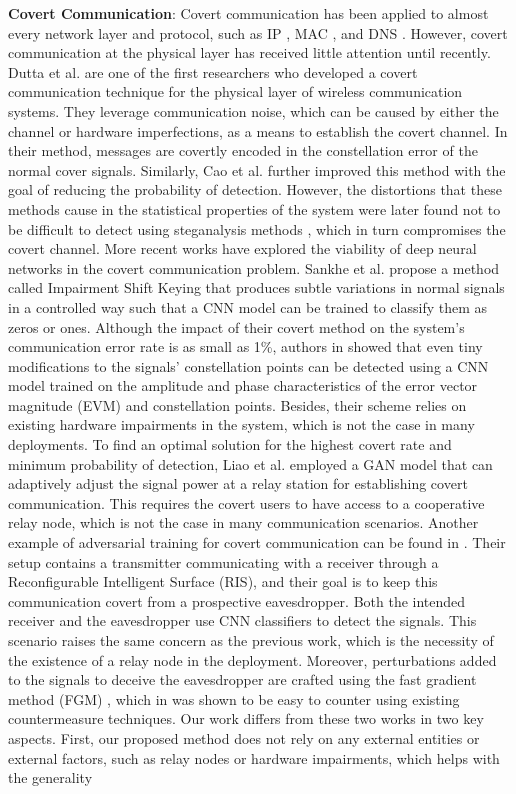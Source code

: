 \textbf{Covert Communication}: Covert communication has been applied to almost every network layer and protocol, such as IP \cite{cabuk2004ip}, MAC \cite{sheikholeslami2020covert}, and DNS \cite{nussbaum2009robust}. However, covert communication at the physical layer has received little attention until recently. Dutta et al. \cite{dutta2012secret} are one of the first researchers who developed a covert communication technique for the physical layer of wireless communication systems. They leverage communication noise, which can be caused by either the channel or hardware imperfections, as a means to establish the covert channel. In their method, messages are covertly encoded in the constellation error of the normal cover signals. Similarly, Cao et al. \cite{cao2018wireless} further improved this method with the goal of reducing the probability of detection. However, the distortions that these methods cause in the statistical properties of the system were later found not to be difficult to detect using steganalysis methods \cite{huang2020exploiting}, which in turn compromises the covert channel. More recent works have explored the viability of deep neural networks in the covert communication problem. Sankhe et al. \cite{sankhe2019impairment} propose a method called Impairment Shift Keying that produces subtle variations in normal signals in a controlled way such that a CNN model can be trained to classify them as zeros or ones. Although the impact of their covert method on the system's communication error rate is as small as 1\%, authors in \cite{huang2021detection} showed that even tiny modifications to the signals' constellation points can be detected using a CNN model trained on the amplitude and phase characteristics of the error vector magnitude (EVM) and constellation points. Besides, their scheme relies on existing hardware impairments in the system, which is not the case in many deployments. To find an optimal solution for the highest covert rate and minimum probability of detection, Liao et al. \cite{liao2020generative} employed a GAN model that can adaptively adjust the signal power at a relay station for establishing covert communication. This requires the covert users to have access to a cooperative relay node, which is not the case in many communication scenarios. Another example of adversarial training for covert communication can be found in \cite{kim2022covert}. Their setup contains a transmitter communicating with a receiver through a Reconfigurable Intelligent Surface (RIS), and their goal is to keep this communication covert from a prospective eavesdropper. Both the intended receiver and the eavesdropper use CNN classifiers to detect the signals. This scenario raises the same concern as the previous work, which is the necessity of the existence of a relay node in the deployment. Moreover, perturbations added to the signals to deceive the eavesdropper are crafted using the fast gradient method (FGM) \cite{goodfellow2014explaining}, which in \cite{bahramali2021robust} was shown to be easy to counter using existing countermeasure techniques. Our work differs from these two works in two key aspects. First, our proposed method does not rely on any external entities or external factors, such as relay nodes or hardware impairments, which helps with the generality 
